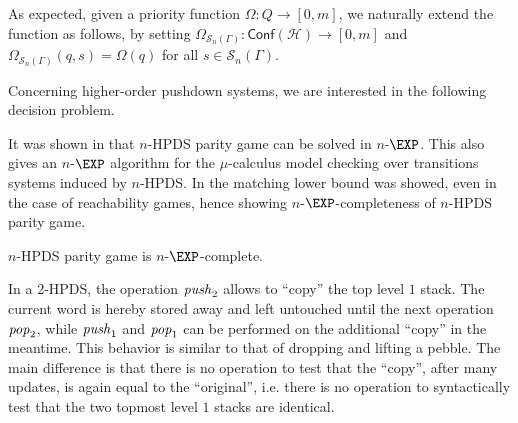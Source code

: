 \documentclass[a4paper,UKenglish,cleveref, autoref, thm-restate]{lipics-v2021}
\newcommand{\problemx}[3]{
	\vspace{0.2cm}
\par\noindent\underline{\sc#1}\par\nobreak\vskip.2\baselineskip
\begingroup\clubpenalty10000\widowpenalty10000
\setbox0\hbox{\bf INPUT:\ }\setbox1\hbox{\bf QUESTION:\ }
\dimen0=\wd0\ifnum\wd1>\dimen0\dimen0=\wd1\fi
\vskip-\parskip\noindent
\hbox to\dimen0{\box0\hfil}\hangindent\dimen0\hangafter1\ignorespaces#2\par
\vskip-\parskip\noindent
\hbox to\dimen0{\box1\hfil}\hangindent\dimen0\hangafter1\ignorespaces#3\par
\endgroup
	\vspace{-0.2cm}
}
\renewcommand{\H}{\mathcal{H}}
\newcommand{\Conf}{\mathsf{Conf}}
\newcommand{\win}{\textsc{Win}}
\begin{document}
As expected, given a 
priority function $\Omega: Q \to [0, m]$,
we naturally extend the function
as follows,
by setting
$\Omega_{\mathscr{S}_n(\Gamma)}: \Conf(\mathcal{H}) \to [0, m]$
and
$\Omega_{\mathscr{S}_n(\Gamma)}(q, s) = \Omega(q)$
for all
$s \in \mathscr{S}_n(\Gamma)$.





Concerning higher-order pushdown systems, we are interested in the following decision problem. 


It was shown in \cite{Cach03} that {\sc $n$-HPDS parity game} can
be solved in $n$-$\EXP$. This also gives an $n$-$\EXP$ algorithm for the $\mu$-calculus
model checking over transitions systems induced by  $n$-HPDS.
In \cite{cachat2007complexity} the matching lower bound was showed, even in the case of reachability games,
hence showing $n$-$\EXP$-completeness of {\sc $n$-HPDS parity game}.

\begin{theorem}{\cite{ Cach03, cachat2007complexity}}
{\sc $n$-HPDS parity game} is $n$-$\EXP$-complete.
\end{theorem}





In a $2$-HPDS, the operation $\text{\textit{push}}_2$ 
allows to ``copy'' the top level $1$ stack. The current word is hereby stored away and left untouched
until the next operation $\text{\textit{pop}}_2$,
while $\text{\textit{push}}_1$ and $\text{\textit{pop}}_1$ can be performed on the additional ``copy'' in the meantime. This behavior is similar to that of dropping and lifting a pebble. 
The main difference is that there is no operation to test that the ``copy'', after many updates, is again equal to the ``original'', i.e. there is no operation to syntactically test that the two topmost level $1$ stacks are identical.
\end{document}
